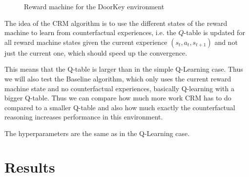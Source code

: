 \documentclass[12pt, a4paper]{article}
\begin{document}
\usetikzlibrary{graphs, quotes}
\begin{figure}[h]
	\centering
	\caption{Reward machine for the DoorKey environment}
	\label{fig:rm}
\end{figure}

The idea of the CRM algorithm is to use the different states of the reward machine to learn from counterfactual experiences, i.e. the $Q$-table is updated for all reward machine states given the current experience $(s_t, a_t, s_{t+1})$ and not just the current one, which should speed up the convergence.

This means that the Q-table is larger than in the simple Q-Learning case. Thus we will also test the Baseline algorithm, which only uses the current reward machine state and no counterfactual experiences, basically Q-learning with a bigger Q-table. Thus we can compare how much more work CRM has to do compared to a smaller Q-table and also how much exactly the counterfactual reasoning increases performance in this environment.

The hyperparameters are the same as in the Q-Learning case.

\section*{Results}
\end{document}
